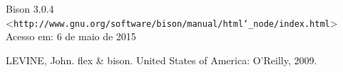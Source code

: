 \begin{thebibliography}{9}


		Bison 3.0.4 \\
		\textless\texttt{http://www.gnu.org/software/bison/manual/html\char`_node/index.html}\textgreater\\
		Acesso em: 6 de maio de 2015

		LEVINE, John. flex \& bison. United States of America: O'Reilly, 2009.


\end{thebibliography}

